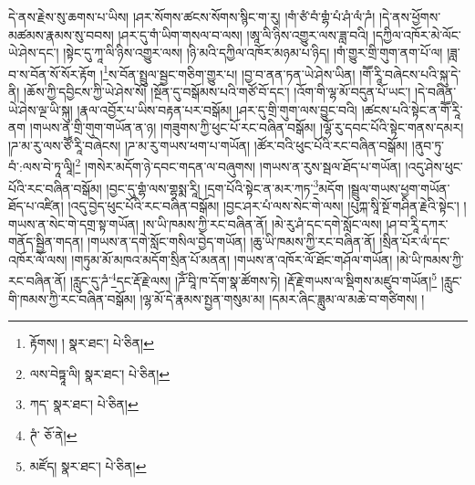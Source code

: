 དེ་ནས་རྗེས་སུ་ཆགས་པ་ཡིས། །ཤར་སོགས་ཚངས་སོགས་སྙིང་ག་རུ། །གཾ་ཙཾ་བཾ་གྷཾ་པཾ་ཤཾ་ལཾ་ཌཾ། །དེ་ནས་ཕྱོགས་མཚམས་རྣམས་སུ་བབས། །ཤར་དུ་གཾ་ཡིག་གསལ་བ་ལས། །ཨཱ་ལི་ཉིས་འགྱུར་ལས་ཟླ་བའི། །དཀྱིལ་འཁོར་མེ་ལོང་ཡེ་ཤེས་དང་། །སྟེང་དུ་ཀཱ་ལི་ཉིས་འགྱུར་ལས། །ཉི་མའི་དཀྱིལ་འཁོར་མཉམ་པ་ཉིད། །གཾ་གྱུར་གྲི་གུག་ནག་པོ་ལ། །ཟླ་བ་ས་བོན་སོ་སོར་རྟོག །\footnote{རྟོགས། །  སྣར་ཐང་།  པེ་ཅིན། }ས་བོན་སྤྲུལ་སྦྱང་གཅིག་གྱུར་པ། །བྱ་བ་ནན་ཏན་ཡེ་ཤེས་ཡིན། །གཽ་རཱི་བཞེངས་པའི་སྐུ་དེ་ནི། །ཆོས་ཀྱི་དབྱིངས་ཀྱི་ཡེ་ཤེས་སོ། །སྔོན་དུ་བསྒོམས་པའི་གཙོ་བོ་དང་། །འོག་གི་ལྷ་མོ་བདུན་པོ་ཡང་། །དེ་བཞིན་ཡེ་ཤེས་ལྔ་ཡི་སྐུ། །རྣལ་འབྱོར་པ་ཡིས་བརྟན་པར་བསྒོམ། །ཤར་དུ་གྲི་གུག་ལས་བྱུང་བའི། །ཚངས་པའི་སྟེང་ན་གཽ་རཱི་ནག །གཡས་ན་གྲི་གུག་གཡོན་ན་ཉ། །གཟུགས་ཀྱི་ཕུང་པོ་རང་བཞིན་བསྒོམ། །ལྷོ་རུ་དབང་པོའི་སྟེང་གནས་དམར། །ཌ་མ་རུ་ལས་ཙཽ་རཱི་བཞེངས། །ཌ་མ་རུ་གཡས་ཕག་པ་གཡོན། །ཚོར་བའི་ཕུང་པོའི་རང་བཞིན་བསྒོམ། །ནུབ་ཏུ་བཾ་:ལས་བེ་ཏཱ་ལཱི།\footnote{ལས་བེཏྟཱ་ལི།  སྣར་ཐང་།  པེ་ཅིན། } །གསེར་མདོག་ཉེ་དབང་གདན་ལ་བཞུགས། །གཡས་ན་རུས་སྦལ་ཐོད་པ་གཡོན། །འདུ་ཤེས་ཕུང་པོའི་རང་བཞིན་བསྒོམ། །བྱང་དུ་གྷཾ་ལས་གྷསྨ་རཱི། །དྲག་པོའི་སྟེང་ན་མར་ཀཏ་\footnote{ཀད་  སྣར་ཐང་།  པེ་ཅིན། }མདོག །སྦྲུལ་གཡས་ཕྱག་གཡོན་ཐོད་པ་འཛིན། །འདུ་བྱེད་ཕུང་པོའི་རང་བཞིན་བསྒོམ། །བྱང་ཤར་པཾ་ལས་སེང་གེ་ལས། །པུཀྐ་སཱི་སྔོ་གཤིན་རྗེའི་སྟེང་། །གཡས་ན་སེང་གེ་དགྲ་སྟ་གཡོན། །ས་ཡི་ཁམས་ཀྱི་རང་བཞིན་ནོ། །མེ་རུ་ཤཾ་དང་དགེ་སློང་ལས། །ཤ་བ་རཱི་དཀར་གནོད་སྦྱིན་གདན། །གཡས་ན་དགེ་སློང་གསིལ་བྱེད་གཡོན། །ཆུ་ཡི་ཁམས་ཀྱི་རང་བཞིན་ནོ། །སྲིན་པོར་ལཾ་དང་འཁོར་ལོ་ལས། །གཏུམ་མོ་མཁའ་མདོག་སྲིན་པོ་མནན། །གཡས་ན་འཁོར་ལོ་ཐོང་གཤོལ་གཡོན། །མེ་ཡི་ཁམས་ཀྱི་རང་བཞིན་ནོ། །རླུང་དུ་ཌཾ་\footnote{ཊཾ་  ཅོ་ནེ། }དང་རྡོ་རྗེ་ལས། །ཌོཾ་བཱི་ཁ་དོག་སྣ་ཚོགས་ཏེ། །རྡོ་རྗེ་གཡས་ལ་སྡིགས་མཛུབ་གཡོན།\footnote{མཛོད།  སྣར་ཐང་།  པེ་ཅིན། } །རླུང་གི་ཁམས་ཀྱི་རང་བཞིན་བསྒོམ། །ལྷ་མོ་དེ་རྣམས་སྤྱན་གསུམ་མ། །དམར་ཞིང་ཟླུམ་ལ་མཆེ་བ་གཙིགས། །

